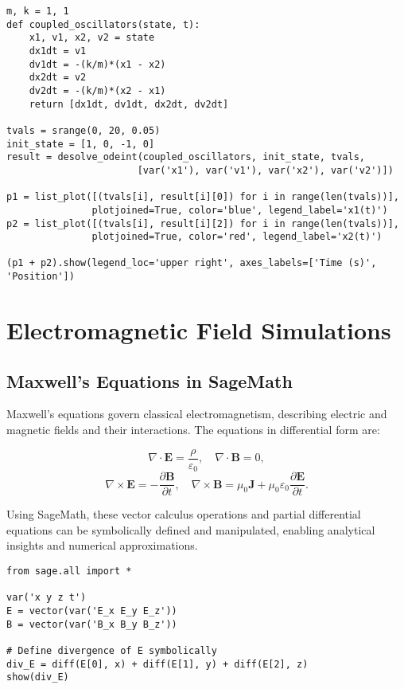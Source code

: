 \documentclass[12pt]{book}
\begin{document}
\begin{verbatim}
m, k = 1, 1
def coupled_oscillators(state, t):
    x1, v1, x2, v2 = state
    dx1dt = v1
    dv1dt = -(k/m)*(x1 - x2)
    dx2dt = v2
    dv2dt = -(k/m)*(x2 - x1)
    return [dx1dt, dv1dt, dx2dt, dv2dt]

tvals = srange(0, 20, 0.05)
init_state = [1, 0, -1, 0]
result = desolve_odeint(coupled_oscillators, init_state, tvals,
                       [var('x1'), var('v1'), var('x2'), var('v2')])

p1 = list_plot([(tvals[i], result[i][0]) for i in range(len(tvals))],
               plotjoined=True, color='blue', legend_label='x1(t)')
p2 = list_plot([(tvals[i], result[i][2]) for i in range(len(tvals))],
               plotjoined=True, color='red', legend_label='x2(t)')

(p1 + p2).show(legend_loc='upper right', axes_labels=['Time (s)', 'Position'])
\end{verbatim}

\chapter{Electromagnetic Field Simulations}

\section{Maxwell's Equations in SageMath}

Maxwell’s equations govern classical electromagnetism, describing electric and magnetic fields and their interactions. The equations in differential form are:

\[
\nabla \cdot \mathbf{E} = \frac{\rho}{\varepsilon_0}, \quad
\nabla \cdot \mathbf{B} = 0,
\]
\[
\nabla \times \mathbf{E} = -\frac{\partial \mathbf{B}}{\partial t}, \quad
\nabla \times \mathbf{B} = \mu_0 \mathbf{J} + \mu_0 \varepsilon_0 \frac{\partial \mathbf{E}}{\partial t}.
\]

Using SageMath, these vector calculus operations and partial differential equations can be symbolically defined and manipulated, enabling analytical insights and numerical approximations.

\begin{verbatim}
from sage.all import *

var('x y z t')
E = vector(var('E_x E_y E_z'))
B = vector(var('B_x B_y B_z'))

# Define divergence of E symbolically
div_E = diff(E[0], x) + diff(E[1], y) + diff(E[2], z)
show(div_E)
\end{verbatim}
\end{document}
